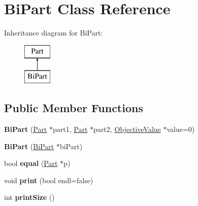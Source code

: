 \hypertarget{classBiPart}{\section{Bi\-Part Class Reference}
\label{classBiPart}
}
Inheritance diagram for Bi\-Part\-:\begin{figure}[H]
\begin{center}
\leavevmode
\includegraphics[height=2.000000cm]{classBiPart}
\end{center}
\end{figure}
\subsection*{Public Member Functions}
\begin{DoxyCompactItemize}
\item 
\hypertarget{classBiPart_aa3d9446a9207461c5b9ec328c3ef61ae}{{\bfseries Bi\-Part} (\hyperlink{classPart}{Part} $\ast$part1, \hyperlink{classPart}{Part} $\ast$part2, \hyperlink{classObjectiveValue}{Objective\-Value} $\ast$value=0)}\label{classBiPart_aa3d9446a9207461c5b9ec328c3ef61ae}

\item 
\hypertarget{classBiPart_ae80858643535d37f3cc96f0fccc947ff}{{\bfseries Bi\-Part} (\hyperlink{classBiPart}{Bi\-Part} $\ast$bi\-Part)}\label{classBiPart_ae80858643535d37f3cc96f0fccc947ff}

\item 
\hypertarget{classBiPart_a242f8d88da324a08bd296ea69cd7360f}{bool {\bfseries equal} (\hyperlink{classPart}{Part} $\ast$p)}\label{classBiPart_a242f8d88da324a08bd296ea69cd7360f}

\item 
\hypertarget{classBiPart_a2fb0a97551bcfc4a9bda5fa1307703d6}{void {\bfseries print} (bool endl=false)}\label{classBiPart_a2fb0a97551bcfc4a9bda5fa1307703d6}

\item 
\hypertarget{classBiPart_aace53eab6f4e8b2f676c0ed7d8f6c9b5}{int {\bfseries print\-Size} ()}\label{classBiPart_aace53eab6f4e8b2f676c0ed7d8f6c9b5}

\end{DoxyCompactItemize}
